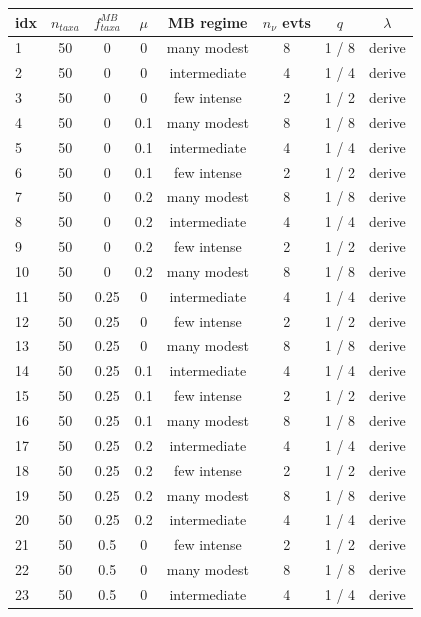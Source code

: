 \documentclass{article}
\begin{document}
\begin{table}
  \centering 
  \begin{tabular}{ l | c | c | c | c   c   c | c }
    \hline
idx & $n_{taxa}$ & $f_{taxa}^{MB}$ & $\mu$ & MB regime & $n_{\nu}$ evts & $q$ & $\lambda$ \\
    \hline
    \hline
1 & 50 & 0 & 0 & many modest  & 8 & 1 / 8 & derive \\
2 & 50 & 0 & 0 & intermediate & 4 & 1 / 4 & derive \\
3 & 50 & 0 & 0 & few intense & 2 & 1 / 2 & derive \\
4 & 50 & 0 & 0.1 & many modest  & 8 & 1 / 8 & derive \\
5 & 50 & 0 & 0.1 & intermediate & 4 & 1 / 4 & derive \\
6 & 50 & 0 & 0.1 & few intense & 2 & 1 / 2 & derive \\
7 & 50 & 0 & 0.2 & many modest  & 8 & 1 / 8 & derive \\
8 & 50 & 0 & 0.2 & intermediate & 4 & 1 / 4 & derive \\
9 & 50 & 0 & 0.2 & few intense & 2 & 1 / 2 & derive \\
10 & 50 & 0 & 0.2 & many modest  & 8 & 1 / 8 & derive \\
11 & 50 & 0.25 & 0 & intermediate & 4 & 1 / 4 & derive \\
12 & 50 & 0.25 & 0 & few intense & 2 & 1 / 2 & derive \\
13 & 50 & 0.25 & 0 & many modest  & 8 & 1 / 8 & derive \\
14 & 50 & 0.25 & 0.1 & intermediate & 4 & 1 / 4 & derive \\
15 & 50 & 0.25 & 0.1 & few intense & 2 & 1 / 2 & derive \\
16 & 50 & 0.25 & 0.1 & many modest  & 8 & 1 / 8 & derive \\
17 & 50 & 0.25 & 0.2 & intermediate & 4 & 1 / 4 & derive \\
18 & 50 & 0.25 & 0.2 & few intense & 2 & 1 / 2 & derive \\
19 & 50 & 0.25 & 0.2 & many modest  & 8 & 1 / 8 & derive \\
20 & 50 & 0.25 & 0.2 & intermediate & 4 & 1 / 4 & derive \\
21 & 50 & 0.5 & 0 & few intense & 2 & 1 / 2 & derive \\
22 & 50 & 0.5 & 0 & many modest  & 8 & 1 / 8 & derive \\
23 & 50 & 0.5 & 0 & intermediate & 4 & 1 / 4 & derive \\

\end{tabular}
\end{table}
\end{document}
